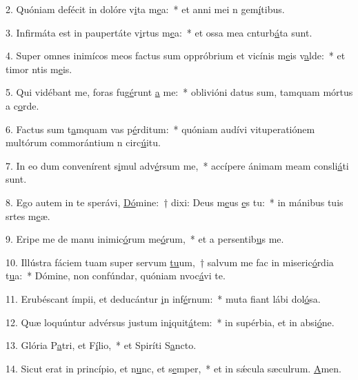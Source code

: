2. Quóniam defécit in dolóre v\uline{i}ta m\uline{e}a:~* et anni mei n gem\uline{í}tibus.\par 
3. Infirmáta est in paupertáte v\uline{i}rtus m\uline{e}a:~* et ossa mea cnturb\uline{á}ta sunt.\par 
4. Super omnes inimícos meos factus sum oppróbrium et vicínis m\uline{e}is v\uline{a}lde:~* et timor ntis m\uline{e}is.\par 
5. Qui vidébant me, foras fug\uline{é}runt \uline{a} me:~* oblivióni datus sum, tamquam mórtus a c\uline{o}rde.\par 
6. Factus sum t\uline{a}mquam vas p\uline{é}rditum:~* quóniam audívi vituperatiónem multórum commorántium n circ\uline{ú}itu.\par 
7. In eo dum convenírent s\uline{i}mul adv\uline{é}rsum me,~* accípere ánimam meam consli\uline{á}ti sunt.\par 
8. Ego autem in te sperávi, \uline{Dó}mine:~† dixi: Deus m\uline{e}us \uline{e}s tu:~* in mánibus tuis srtes m\uline{e}æ.\par 
9. Eripe me de manu inimic\uline{ó}rum me\uline{ó}rum,~* et a persentib\uline{u}s me.\par 
10. Illústra fáciem tuam super servum \uline{tu}um,~† salvum me fac in miseric\uline{ó}rdia t\uline{u}a:~* Dómine, non confúndar, quóniam nvoc\uline{á}vi te.\par 
11. Erubéscant ímpii, et deducántur \uline{i}n inf\uline{é}rnum:~* muta fiant lábi dol\uline{ó}sa.\par 
12. Quæ loquúntur advérsus justum in\uline{i}quit\uline{á}tem:~* in supérbia, et in absi\uline{ó}ne.\par 
13. Glória P\uline{a}tri, et F\uline{í}lio,~* et Spiríti S\uline{a}ncto.\par 
14. Sicut erat in princípio, et n\uline{u}nc, et s\uline{e}mper,~* et in sǽcula sæculrum. \uline{A}men.\par 
